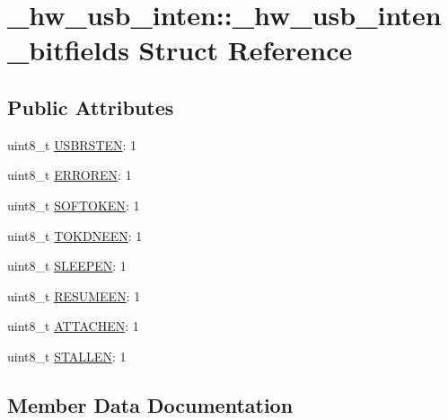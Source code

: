 \hypertarget{struct__hw__usb__inten_1_1__hw__usb__inten__bitfields}{}\section{\+\_\+hw\+\_\+usb\+\_\+inten\+:\+:\+\_\+hw\+\_\+usb\+\_\+inten\+\_\+bitfields Struct Reference}
\label{struct__hw__usb__inten_1_1__hw__usb__inten__bitfields}
\subsection*{Public Attributes}
\begin{DoxyCompactItemize}
\item 
uint8\+\_\+t \hyperlink{struct__hw__usb__inten_1_1__hw__usb__inten__bitfields_a453f301f834b3c14baa862cf391235d5}{U\+S\+B\+R\+S\+T\+EN}\+: 1
\item 
uint8\+\_\+t \hyperlink{struct__hw__usb__inten_1_1__hw__usb__inten__bitfields_a0fef3a2bde057b1b36e299cb7c7fce1c}{E\+R\+R\+O\+R\+EN}\+: 1
\item 
uint8\+\_\+t \hyperlink{struct__hw__usb__inten_1_1__hw__usb__inten__bitfields_ab51659cf986395f181c62893b300ad6f}{S\+O\+F\+T\+O\+K\+EN}\+: 1
\item 
uint8\+\_\+t \hyperlink{struct__hw__usb__inten_1_1__hw__usb__inten__bitfields_a3eae07db128f316ce8ddf8deb26465cd}{T\+O\+K\+D\+N\+E\+EN}\+: 1
\item 
uint8\+\_\+t \hyperlink{struct__hw__usb__inten_1_1__hw__usb__inten__bitfields_a572302701a01cb2591bcd6f01e1952ab}{S\+L\+E\+E\+P\+EN}\+: 1
\item 
uint8\+\_\+t \hyperlink{struct__hw__usb__inten_1_1__hw__usb__inten__bitfields_aefdee802cbcd235c269736d5f6d3c006}{R\+E\+S\+U\+M\+E\+EN}\+: 1
\item 
uint8\+\_\+t \hyperlink{struct__hw__usb__inten_1_1__hw__usb__inten__bitfields_a73b79e8ebdac5bbf31da96d568a8c20b}{A\+T\+T\+A\+C\+H\+EN}\+: 1
\item 
uint8\+\_\+t \hyperlink{struct__hw__usb__inten_1_1__hw__usb__inten__bitfields_a8f1df7d3844b80cfe5155fd796c8c40b}{S\+T\+A\+L\+L\+EN}\+: 1
\end{DoxyCompactItemize}


\subsection{Member Data Documentation}
